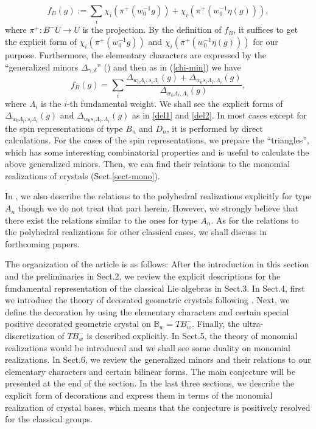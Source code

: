 \[
 f_B(g):=\sum_i\chi_i(\pi^+(w_0^{-1}g))+\chi_i(\pi^+(w_0^{-1}\eta(g))),
\]
where $\pi^+:B^-U\to U$ is the projection.
By the definition of $f_B$, it suffices to get the explicit form of 
$\chi_i(\pi^+(w_0^{-1}g))$ and $\chi_i(\pi^+(w_0^{-1}\eta(g)))$ for our 
purpose. 
Furthermore, the elementary characters are expressed by the ``generalized
minors ${\Delta}_{\gamma,{\delta}}$''
(\cite{BFZ,BZ,BZ2})  and then as in (\ref{chi-min}) we have  
\[
f_B(g)= \sum_i\frac{{\Delta}_{w_0{\Lambda}_i,s_i{\Lambda}_i}(g)
+{\Delta}_{w_0s_i{\Lambda}_i,{\Lambda}_i}(g)}
{{\Delta}_{w_0{\Lambda}_i,{\Lambda}_i}(g)},
\]
where ${\Lambda}_i$ is the $i$-th fundamental weight. 
We shall see the explicit forms of ${\Delta}_{w_0{\Lambda}_i,s_i{\Lambda}_i}(g)$
and ${\Delta}_{w_0s_i{\Lambda}_i,{\Lambda}_i}(g)$ as in \eqref{del1} and \eqref{del2}. 
In most cases except for the spin
representations of type $B_n$ and $D_n$, it is performed by 
direct calculations. For the cases of the spin representations, 
we prepare the ``triangles'',
which has some interesting combinatorial properties and is useful to calculate 
the above generalized minors.
Then, we can find their relations to the monomial realizations of crystals
(Sect.\ref{sect-mono}).

In \cite{N4}, we also describe the relations to the polyhedral
realizations explicitly for type $A_n$ though we do not treat 
that part herein. However, we strongly believe that there exist the 
relations similar to the ones for type $A_n$. 
As for the relations to the polyhedral realizations for 
other classical cases, we shall discuss in forthcoming papers.

The organization of the article is as follows:
After the introduction in this section and the preliminaries in Sect.2, 
we review the explicit descriptions for the 
fundamental representation of the classical Lie algebras in Sect.3.
In Sect.4, first we introduce the theory of decorated geometric 
crystals following \cite{BK2}.  Next, we define the decoration by using the 
elementary characters and certain special positive decorated geometric
crystal on ${\mathbb B}_w=TB^-_w$. Finally, the ultra-discretization of $TB^-_w$ is
described explicitly. 
In Sect.5, 
the theory of monomial realizations would be introduced and we shall see
some duality on monomial realizations.
In Sect.6, we review the generalized minors and their relations to 
our elementary characters and certain bilinear forms.
The main conjecture will be presented at the end of the section.
In the last three sections, we describe the explicit form of decorations
and express them in terms of the monomial realization of crystal bases, 
which means that the conjecture is positively resolved for the classical
groups.

